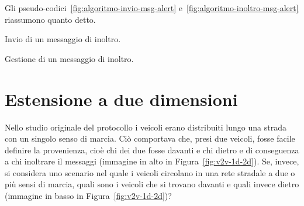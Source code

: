 Gli pseudo-codici~\ref{fig:algoritmo-invio-msg-alert} e~\ref{fig:algoritmo-inoltro-msg-alert} riassumono quanto detto.
%
\begin{italianalgorithm}[h]
\caption{Invio di un messaggio di inoltro.}\label{fig:algoritmo-invio-msg-alert}
\begin{algorithmic}[1]
\end{algorithmic}
\end{italianalgorithm}
%
\begin{italianalgorithm}[h]
\caption{Gestione di un messaggio di inoltro.}\label{fig:algoritmo-inoltro-msg-alert}
\begin{algorithmic}[1]
	\Else{}
	\EndIf{}
\end{algorithmic}
\end{italianalgorithm}
%
\section{Estensione a due dimensioni}\label{sec:fb-estensione-due-dimensioni}
Nello studio originale del protocollo i veicoli erano distribuiti lungo una strada con un singolo senso di marcia.
Ciò comportava che, presi due veicoli, fosse facile definire la provenienza, cioè chi dei due fosse davanti e chi dietro
e di conseguenza a chi inoltrare il messaggi (immagine in alto in Figura~\ref{fig:v2v-1d-2d}).
Se, invece, si considera uno scenario nel quale i veicoli circolano in una rete stradale a due o più sensi di marcia,
quali sono i veicoli che si trovano davanti e quali invece dietro (immagine in basso in Figura~\ref{fig:v2v-1d-2d})?


